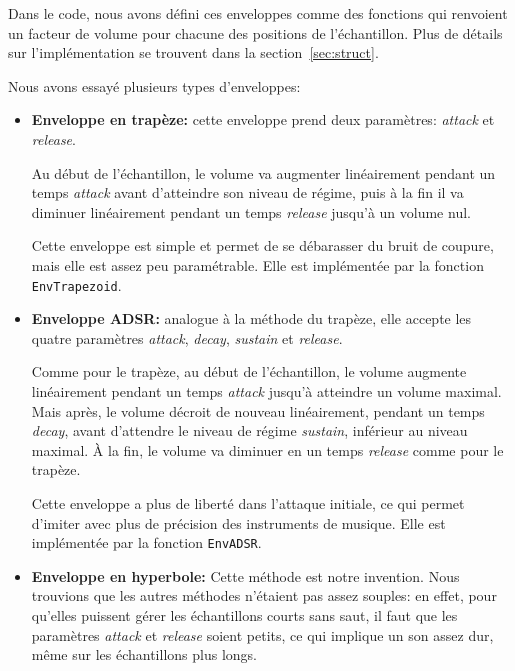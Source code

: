 \documentclass[a4paper,12pt]{article}
\begin{document}
Dans le code, nous avons défini ces enveloppes comme des fonctions
qui renvoient un facteur de volume pour chacune des positions
de l'échantillon.
Plus de détails sur l'implémentation se trouvent
dans la section~\ref{sec:struct}.

Nous avons essayé plusieurs types d'enveloppes:
\begin{itemize}
    \item \textbf{Enveloppe en trapèze:} cette enveloppe prend deux paramètres:
        \emph{attack} et \emph{release}.
        
        Au début de l'échantillon, le volume va augmenter linéairement
        pendant un temps \emph{attack} avant d'atteindre son niveau de régime,
        puis à la fin il va diminuer linéairement pendant un temps
        \emph{release} jusqu'à un volume nul.
        
        Cette enveloppe est simple et permet de se débarasser du bruit de
        coupure, mais elle est assez peu paramétrable.
        Elle est implémentée par la fonction \texttt{EnvTrapezoid}.
    
    \item \textbf{Enveloppe ADSR:} analogue à la méthode du trapèze,
        elle accepte les quatre paramètres \emph{attack}, \emph{decay},
        \emph{sustain} et \emph{release}.
        
        Comme pour le trapèze, au début de l'échantillon, le volume augmente
        linéairement pendant un temps \emph{attack} jusqu'à atteindre un volume
        maximal. Mais après, le volume décroit de nouveau linéairement,
        pendant un temps \emph{decay}, avant d'attendre le niveau de régime
        \emph{sustain}, inférieur au niveau maximal.
        À la fin, le volume va diminuer en un temps \emph{release} comme pour
        le trapèze.
        
        Cette enveloppe a plus de liberté dans l'attaque initiale, ce qui
        permet d'imiter avec plus de précision des instruments de musique.
        Elle est implémentée par la fonction \texttt{EnvADSR}.
    
    \item \textbf{Enveloppe en hyperbole:}
        Cette méthode est notre invention.
        Nous trouvions que les autres méthodes n'étaient pas assez souples:
        en effet, pour qu'elles puissent gérer
        les échantillons courts sans saut,
        il faut que les paramètres \emph{attack} et \emph{release}
        soient petits, ce qui implique un son assez dur,
        même sur les échantillons plus longs.
        

\end{itemize}
\end{document}
